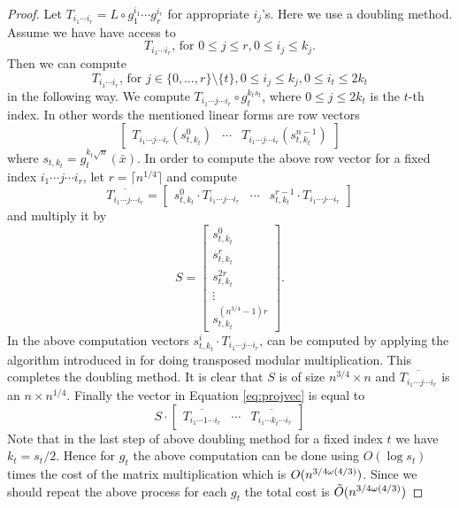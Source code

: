 \begin{proof}
Let $T_{i_1\cdots i_r} = L \circ g_1^{i_1}\cdots g_r^{i_r}$ for appropriate $i_j$'s. Here we use a doubling method. Assume we have have access to 
$$T_{i_1\cdots i_r}, \, \mathrm{for}\,\, 0\leq j \leq r, 0 \leq i_j \leq k_j.$$
Then we can compute 
$$T_{i_1\cdots i_r}, \, \mathrm{for}\,\, j \in \lbrace 0, \ldots, r\rbrace \setminus \lbrace t \rbrace, 0 \leq i_j \leq k_j, 0 \leq i_t \leq 2k_t$$
in the following way. We compute $T_{i_1 \cdots j \cdots i_r} \circ g_t^{k_t s_t}$, where $0\leq j \leq 2k_t$ is the $t$-th index. In other words the mentioned linear forms are row vectors
\begin{equation}\label{eq:projvec}
\begin{bmatrix} T_{i_1 \cdots j \cdots i_r}(s_{t,k_t}^0) & \cdots & T_{i_1 \cdots j \cdots i_r}(s_{t,k_t}^{n-1}) \end{bmatrix}
\end{equation}
where $s_{t,k_t} = g_t^{k_t\sqrt{n}}(\bar{x})$. In order to compute the above row vector for a fixed index $i_1 \cdots j \cdots i_r$, let $r = \lceil n^{1/4} \rceil$ and compute
$$\overline{T_{i_1 \cdots j \cdots i_r}} = \left[\begin{array}{c|c|c}
s_{t,k_t}^0\cdot T_{i_1 \cdots j \cdots i_r} & \cdots & s_{t,k_t}^{r-1}\cdot T_{i_1 \cdots j \cdots i_r}
\end{array} \right]$$
and multiply it by 
$$S = \left[
\begin{array}{c}
s_{t,k_t}^0\\
\hline
s_{t,k_t}^{r}\\
\hline
s_{t,k_t}^{2r}\\
\hline
\vdots\\
\hline
s_{t,k_t}^{(n^{3/4}-1)r}
\end{array} \right].$$
In the above computation vectors $s_{t,k_t}^i \cdot T_{i_1 \cdots j \cdots i_r}$, can be computed by applying the algorithm introduced in 
\cite{Shoup} for doing transposed modular multiplication. This completes the doubling method. It is clear that $S$ is of size 
$n^{3/4} \times n$ and $\overline{T_{i_1 \cdots j \cdots i_r}}$ is an $n \times n^{1/4}$. Finally the vector in Equation \ref{eq:projvec}
is equal to
$$S \cdot \left[\begin{array}{c|c|c}
\overline{T_{i_1 \cdots 1 \cdots i_r}} & \cdots & \overline{T_{i_1 \cdots k_t \cdots i_r}}
\end{array}\right]
$$
Note that in the last step of above doubling method for a fixed index $t$ we have $k_t = s_t/2$. Hence for $g_t$ the above computation can be done 
using $O(\log s_t)$ times the cost of the matrix multiplication which is $O(n^{3/4 \omega(4/3)})$. Since we should repeat the above process for each $g_t$ the total cost is
$\tilde{O}(n^{3/4 \omega(4/3)})$ 
\end{proof}

